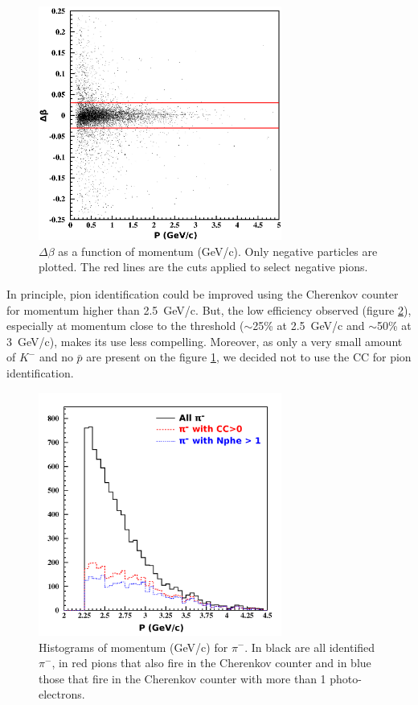 \begin{figure}[tbp]
\centering
\includegraphics[width=8cm] {chap5-fig/fig05.png} 
\caption {$\Delta \beta$ as a 
function of momentum (GeV/c). Only negative particles are plotted. The red 
lines are the cuts applied to select negative pions.}
\label{PionTOF}
\end{figure}

In principle, pion identification could be improved using the Cherenkov counter 
for momentum higher than 2.5~GeV/c. But, the low efficiency observed (figure 
\ref{PionCC}), especially at momentum close to the threshold ($\sim$25\% at 
2.5~GeV/c and $\sim$50\% at 3~GeV/c), makes its use less compelling. 
Moreover, as only a very small amount of $K^-$ and no $\bar p$ are present on 
the figure \ref{PionTOF}, we decided not to use the CC for pion identification.

\begin{figure}[tbp]
\centering
\includegraphics[width=8cm] {chap5-fig/fig06.png} 
\caption {Histograms of momentum (GeV/c) for $\pi^-$. In black are all 
identified $\pi^-$, in red pions that also fire in the Cherenkov counter and 
in blue those that fire in the Cherenkov counter with more than 
1 photo-electrons.}
\label{PionCC}
\end{figure}

